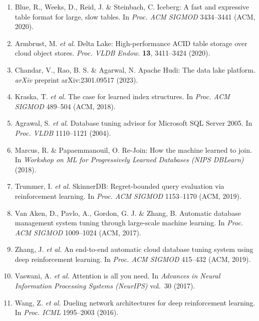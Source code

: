 \documentclass[fleqn,10pt]{wlscirep}
\begin{document}
\begin{enumerate}

\item Blue, R., Weeks, D., Reid, J. \& Steinbach, C. Iceberg: A fast and
  expressive table format for large, slow tables. In \textit{Proc. ACM
  SIGMOD} 3434--3441 (ACM, 2020).

\item Armbrust, M. \textit{et al.} Delta Lake: High-performance ACID table
  storage over cloud object stores. \textit{Proc. VLDB Endow.}
  \textbf{13}, 3411--3424 (2020).

\item Chandar, V., Rao, B. S. \& Agarwal, N. Apache Hudi: The data lake
  platform. \textit{arXiv} preprint arXiv:2301.09517 (2023).

\item Kraska, T. \textit{et al.} The case for learned index structures. In
  \textit{Proc. ACM SIGMOD} 489--504 (ACM, 2018).

\item Agrawal, S. \textit{et al.} Database tuning advisor for Microsoft SQL
  Server 2005. In \textit{Proc. VLDB} 1110--1121 (2004).

\item Marcus, R. \& Papaemmanouil, O. Re-Join: How the machine learned to
  join. In \textit{Workshop on ML for Progressively Learned Databases
  (NIPS DBLearn)} (2018).

\item Trummer, I. \textit{et al.} SkinnerDB: Regret-bounded query evaluation
  via reinforcement learning. In \textit{Proc. ACM SIGMOD} 1153--1170
  (ACM, 2019).

\item Van Aken, D., Pavlo, A., Gordon, G. J. \& Zhang, B. Automatic
  database management system tuning through large-scale machine learning.
  In \textit{Proc. ACM SIGMOD} 1009--1024 (ACM, 2017).

\item Zhang, J. \textit{et al.} An end-to-end automatic cloud database
  tuning system using deep reinforcement learning. In \textit{Proc. ACM
  SIGMOD} 415--432 (ACM, 2019).

\item Vaswani, A. \textit{et al.} Attention is all you need. In
  \textit{Advances in Neural Information Processing Systems (NeurIPS)}
  vol.~30 (2017).

\item Wang, Z. \textit{et al.} Dueling network architectures for deep
  reinforcement learning. In \textit{Proc. ICML} 1995--2003 (2016).


\end{enumerate}
\end{document}
